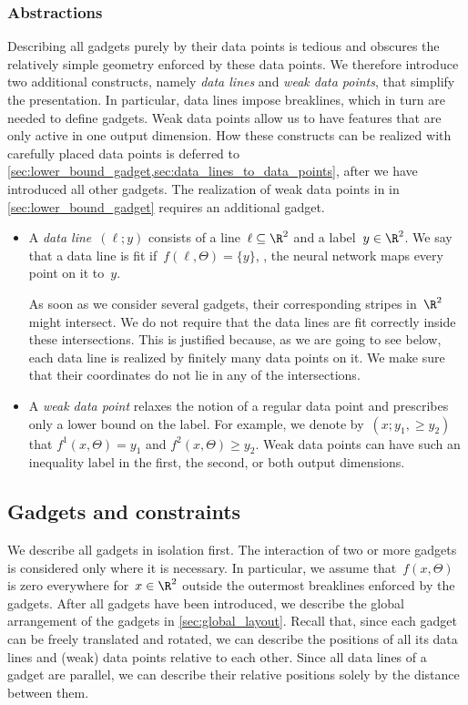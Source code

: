 \documentclass{toc}
\begin{document}
\subsubsection{Abstractions}
Describing all gadgets purely by their data points is tedious and obscures the relatively simple geometry enforced by these data points.
We therefore introduce two additional constructs, namely \emph{data lines} and \emph{weak data points}, that simplify the presentation.
In particular, data lines impose breaklines, which in turn are needed to define gadgets.
Weak data points allow us to have features that are only active in one output dimension.
How these constructs can be realized with carefully placed data points is deferred to \cref{sec:lower_bound_gadget,sec:data_lines_to_data_points}, after we have introduced all other gadgets. The realization of weak data points in in \cref{sec:lower_bound_gadget} requires an additional gadget.

\begin{itemize}
    \item A \emph{data line}~$(\ell; y)$ consists of a line~$\ell \subseteq \R^2$ and a label~$y \in \R^2$.
    We say that a data line is fit if~$f(\ell, \Theta) = \{y\}$, \ie, the neural network maps every point on it to~$y$.
    
    As soon as we consider several gadgets, their corresponding stripes in~$\R^2$ might intersect.
    We do not require that the data lines are fit correctly inside these intersections.
    This is justified because, as we are going to see below, each data line is realized by finitely many data points on it.
    We make sure that their coordinates do not lie in any of the intersections.

    \item A \emph{weak data point} relaxes the notion of a regular data point and prescribes only a lower bound on the label.
    For example, we denote by~$(x; y_1, \geq y_2)$ that $f^1(x, \Theta) = y_1$ and $f^2(x, \Theta) \geq y_2$.
    Weak data points can have such an inequality label in the first, the second, or both output dimensions.
\end{itemize}

\subsection{Gadgets and constraints}
\label{sec:gadgets}

We describe all gadgets in isolation first.
The interaction of two or more gadgets is considered only where it is necessary.
In particular, we assume that~$f(x, \Theta)$ is %
zero everywhere %
for~$x \in \R^2$ outside the outermost breaklines enforced by %
%
%
%
the gadgets.  %
After all gadgets have been introduced, we describe the global arrangement of the gadgets in \cref{sec:global_layout}.
Recall that, since each gadget can be freely translated and rotated, we can describe the positions of all its data lines and (weak) data points relative to each other.
Since all data lines of a gadget are parallel, we can describe their relative positions solely by the distance between them.
\end{document}
